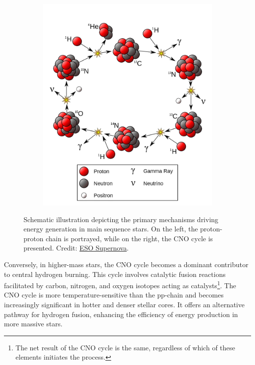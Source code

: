 \documentclass[main.tex]{subfiles}
\begin{document}
\begin{figure}[th!]
\begin{subfigure}{.5\textwidth}
        \includegraphics[scale=0.2]{figures/chapter1/cno-cycle.png}
    \end{subfigure}
        \caption{Schematic illustration depicting the primary mechanisms driving energy generation in main sequence stars. On the left, the proton-proton chain is portrayed, while on the right, the CNO cycle is presented. Credit: \href{https://supernova.eso.org/}{ESO Supernova}.}
        \label{fig:pp_cno}
    \end{figure}
    
    Conversely, in higher-mass stars, the CNO cycle becomes a dominant contributor to central hydrogen burning. This cycle involves catalytic fusion reactions facilitated by carbon, nitrogen, and oxygen isotopes acting as catalysts\footnote{The net result of the CNO cycle is the same, regardless of which of these elements initiates the process.}. The CNO cycle is more temperature-sensitive than the pp-chain and becomes increasingly significant in hotter and denser stellar cores. It offers an alternative pathway for hydrogen fusion, enhancing the efficiency of energy production in more massive stars.
\end{document}
